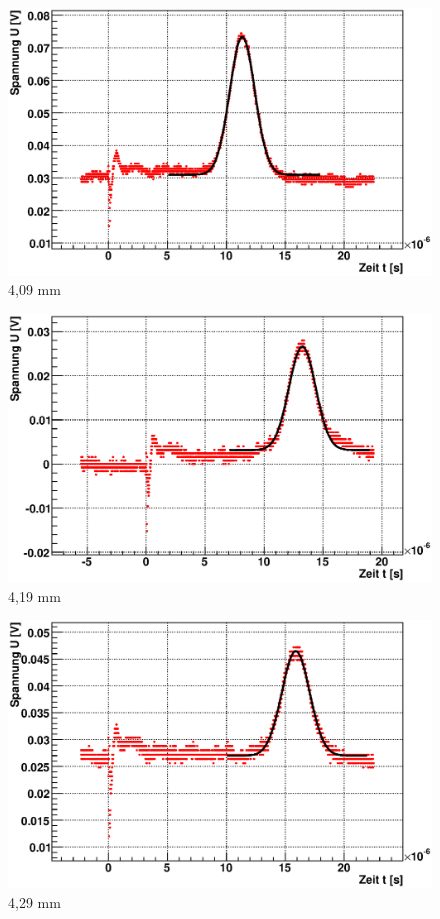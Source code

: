\documentclass[12pt]{article}
\begin{document}
\begin{figure}[H]  
\begin{minipage}{0.33\linewidth}
\centering
\includegraphics[width=0.9\linewidth]{pictures/varDist/08.eps}
\small{4,09 mm}
\end{minipage}
\begin{minipage}{0.33\linewidth}
\centering
\includegraphics[width=0.9\linewidth]{pictures/varDist/02.eps}
\small{4,19 mm}
\end{minipage}
\begin{minipage}{0.33\linewidth}
\centering 
\includegraphics[width=0.9\linewidth]{pictures/varDist/07.eps}
\small{4,29 mm}
\end{minipage}
\end{figure}
\end{document}

